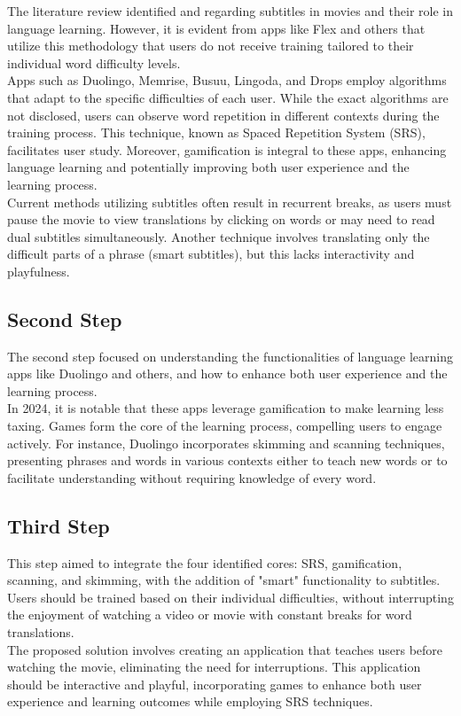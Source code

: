 \documentclass[12pt]{article}
\begin{document}
The literature review identified \cite{ElBatanony21} and \cite{Kovacs14} regarding subtitles in movies and their role in language learning. However, it is evident from apps like Flex and others that utilize this methodology that users do not receive training tailored to their individual word difficulty levels.  \\
Apps such as Duolingo, Memrise, Busuu, Lingoda, and Drops employ algorithms that adapt to the specific difficulties of each user. While the exact algorithms are not disclosed, users can observe word repetition in different contexts during the training process. This technique, known as Spaced Repetition System (SRS), facilitates user study. Moreover, gamification is integral to these apps, enhancing language learning and potentially improving both user experience and the learning process. \\
Current methods utilizing subtitles often result in recurrent breaks, as users must pause the movie to view translations by clicking on words or may need to read dual subtitles simultaneously. Another technique involves translating only the difficult parts of a phrase (smart subtitles), but this lacks interactivity and playfulness. 
\subsection{Second Step}

The second step focused on understanding the functionalities of language learning apps like Duolingo and others, and how to enhance both user experience and the learning process. \\
In 2024, it is notable that these apps leverage gamification to make learning less taxing. Games form the core of the learning process, compelling users to engage actively. For instance, Duolingo incorporates skimming and scanning techniques, presenting phrases and words in various contexts either to teach new words or to facilitate understanding without requiring knowledge of every word. \\ 

\subsection{Third Step}

This step aimed to integrate the four identified cores: SRS, gamification, scanning, and skimming, with the addition of "smart" functionality to subtitles. Users should be trained based on their individual difficulties, without interrupting the enjoyment of watching a video or movie with constant breaks for word translations. \\ 
The proposed solution involves creating an application that teaches users before watching the movie, eliminating the need for interruptions. This application should be interactive and playful, incorporating games to enhance both user experience and learning outcomes while employing SRS techniques.\\ 
\end{document}
